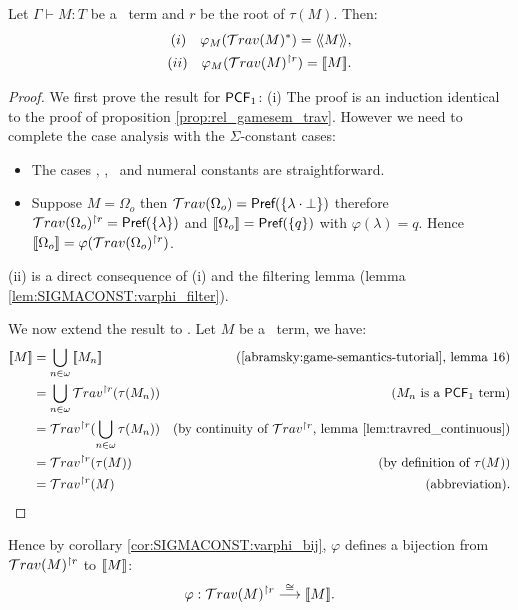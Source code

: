 \begin{prop}
Let $\Gamma \vdash M : T$ be a \pcf\ term and $r$ be the root of
$\tau(M)$. Then:
\begin{align*}
(i)  \quad\varphi_M(\mathcal{T}rav(M)^*) = {\langle\!\langle M \rangle\!\rangle},  \\
(ii) \quad \varphi_M(\mathcal{T}rav(M)^{\upharpoonright r}) = {[\![ M ]\!]}.
\end{align*}
\end{prop}
\begin{proof}
We first prove the result for $\textsf{PCF}_1$: (i) The proof is an
induction identical to the proof of proposition
\ref{prop:rel_gamesem_trav}. However we need to complete the case
analysis with the $\Sigma$-constant cases:
\begin{itemize}
\item The cases \pcfsucc, \pcfpred, \pcfcond\ and numeral constants are straightforward.

\item Suppose $M = \Omega_o$ then $\mathcal{T}rav(\Omega_o) = \textsf{Pref} ( \{ \lambda \cdot \bot \} )$ therefore
$\mathcal{T}rav(\Omega_o)^{\upharpoonright r} = \textsf{Pref}( \{ \lambda \} )$
and ${[\![ \Omega_o ]\!]} = \textsf{Pref}( \{ q \})$ with $\varphi(\lambda) =
q$. Hence ${[\![ \Omega_o ]\!]} = \varphi
(\mathcal{T}rav(\Omega_o)^{\upharpoonright r})$.
\end{itemize}
(ii) is a direct consequence of (i) and the filtering lemma (lemma
\ref{lem:SIGMACONST:varphi_filter}). \vspace{10pt}

\noindent We now extend the result to \pcf. Let $M$ be a \pcf\ term,
we have:
\begin{align*}
{[\![M ]\!]} &= \bigcup_{n\in\omega} {[\![ M_n ]\!]} & (\mbox{\cite{abramsky:game-semantics-tutorial}, lemma 16})\\
&= \bigcup_{n\in\omega} \mathcal{T}rav^{\upharpoonright r}(\tau(M_n)) & (M_n \mbox{ is a $\textsf{PCF}_1$ term}) \\
&= \mathcal{T}rav^{\upharpoonright r}(\bigcup_{n\in\omega} \tau(M_n) ) & (\mbox{by continuity of $\mathcal{T}rav^{\upharpoonright r}$, lemma \ref{lem:travred_continuous}}) \\
&= \mathcal{T}rav^{\upharpoonright r}(\tau(M)) & (\mbox{by definition of } \tau(M)) \\
&= \mathcal{T}rav^{\upharpoonright r}(M) & (\mbox{abbreviation}).
\end{align*}
\end{proof}

Hence by corollary \ref{cor:SIGMACONST:varphi_bij}, $\varphi$
defines a bijection from $\mathcal{T}rav(M)^{\upharpoonright r}$ to
${[\![ M ]\!]}$:
$$\varphi : \mathcal{T}rav(M)^{\upharpoonright r} \stackrel{\cong}{\longrightarrow} {[\![ M ]\!]}.$$

